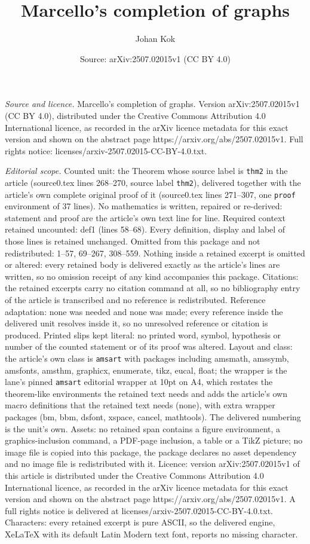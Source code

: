 \documentclass[10pt,a4paper]{amsart}
\title[Marcello's completion of graphs]{Marcello's completion of graphs}
\author{Johan Kok}
\date{Source: arXiv:2507.02015v1 (CC BY 4.0)}
\begin{document}
\maketitle

\noindent\emph{Source and licence.} Marcello's completion of graphs. Version arXiv:2507.02015v1 (CC BY 4.0), distributed under the Creative Commons Attribution 4.0 International licence, as recorded in the arXiv licence metadata for this exact version and shown on the abstract page https://arxiv.org/abs/2507.02015v1. Full rights notice: licenses/arxiv-2507.02015-CC-BY-4.0.txt.\par\smallskip

\noindent\textit{Editorial scope.} Counted unit: the Theorem whose source label is \texttt{thm2} in the article (source0.tex lines 268--270, source label \texttt{thm2}), delivered together with the article's own complete original proof of it (source0.tex lines 271--307, one \texttt{proof} environment of 37 lines). No mathematics is written, repaired or re-derived: statement and proof are the article's own text line for line. Required context retained uncounted: def1 (lines 58--68). Every definition, display and label of those lines is retained unchanged. Omitted from this package and not redistributed: 1--57, 69--267, 308--559. Nothing inside a retained excerpt is omitted or altered: every retained body is delivered exactly as the article's lines are written, so no omission receipt of any kind accompanies this package. Citations: the retained excerpts carry no citation command at all, so no bibliography entry of the article is transcribed and no reference is redistributed. Reference adaptation: none was needed and none was made; every reference inside the delivered unit resolves inside it, so no unresolved reference or citation is produced. Printed slips kept literal: no printed word, symbol, hypothesis or number of the counted statement or of its proof was altered. Layout and class: the article's own class is \texttt{amsart} with packages including amsmath, amssymb, amsfonts, amsthm, graphicx, enumerate, tikz, eucal, float; the wrapper is the lane's pinned \texttt{amsart} editorial wrapper at 10pt on A4, which restates the theorem-like environments the retained text needs and adds the article's own macro definitions that the retained text needs (none), with extra wrapper packages (bm, bbm, dsfont, xspace, cancel, mathtools). The delivered numbering is the unit's own. Assets: no retained span contains a figure environment, a graphics-inclusion command, a PDF-page inclusion, a table or a TikZ picture; no image file is copied into this package, the package declares no asset dependency and no image file is redistributed with it. Licence: version arXiv:2507.02015v1 of this article is distributed under the Creative Commons Attribution 4.0 International licence, as recorded in the arXiv licence metadata for this exact version and shown on the abstract page https://arxiv.org/abs/2507.02015v1. A full rights notice is delivered at licenses/arxiv-2507.02015-CC-BY-4.0.txt. Characters: every retained excerpt is pure ASCII, so the delivered engine, XeLaTeX with its default Latin Modern text font, reports no missing character.
\end{document}

